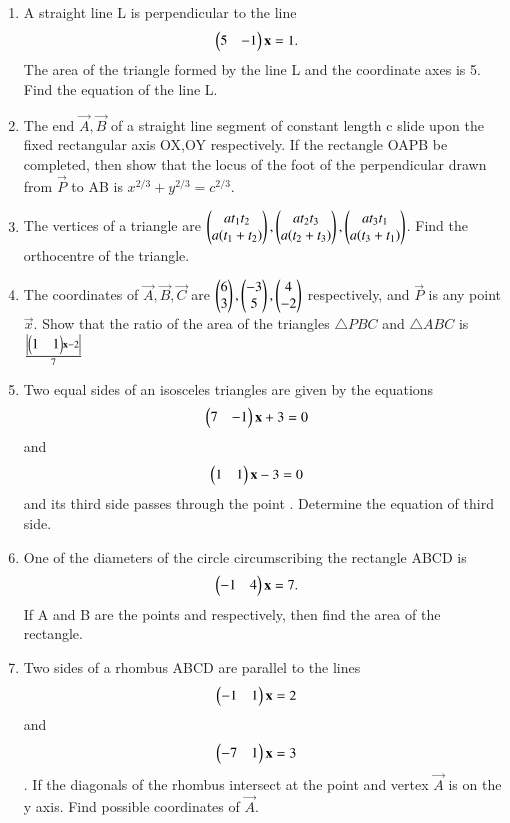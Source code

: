 \begin{enumerate}[label=\arabic*.,ref=\thesubsection.\theenumi]
    \item A straight line L is perpendicular to the line \begin{align}\begin{pmatrix}5 & -1\end{pmatrix} \mathbf {x} &= 1.\end{align} The area of the triangle formed by the line L and the coordinate axes is 5. Find the equation of the line L.
    \item The end $\vec{A},\vec{B}$ of a straight line segment of constant length c slide upon the fixed rectangular axis OX,OY respectively. If the rectangle OAPB be completed, then show that the locus of the foot of the perpendicular drawn from $\vec{P}$ to AB is $x^{2/3}+y^{2/3}=c^{2/3}$.
    \item The vertices of a triangle are $\begin{pmatrix}a t_1t_2 \\ a(t_1+t_2)\end{pmatrix},\begin{pmatrix}a t_2t_3 \\ a(t_2+t_3)\end{pmatrix},\begin{pmatrix}a t_3t_1\\ a(t_3+t_1)\end{pmatrix}$. Find the orthocentre of the triangle.
    \item The coordinates of $\vec{A}, \vec{B}, \vec{C}$ are $\begin{pmatrix}6\\3\end{pmatrix},\begin{pmatrix}-3\\5\end{pmatrix},\begin{pmatrix}4\\-2\end{pmatrix}$ respectively, and $\vec{P}$ is any point $\vec{x}$. Show that the ratio of the area of the triangles $\triangle PBC$ and $\triangle ABC$ is $ \frac{\left\vert\begin{pmatrix}1 & 1\end{pmatrix}\mathbf {x}-2\right\vert}{7}$
    \item Two equal sides of an isosceles triangles are given by the equations \begin{align}\begin{pmatrix}7 & -1\end{pmatrix} \mathbf {x} + 3 &= 0 \end{align} and \begin{align}\begin{pmatrix}1 & 1\end{pmatrix} \mathbf {x} - 3 &= 0 \end{align} and its third side passes through the point . Determine the equation of third side.
    \item One of the diameters of the circle circumscribing the rectangle ABCD is \begin{align}\begin{pmatrix}-1 & 4\end{pmatrix} \mathbf {x}  &= 7. \end{align} If A and B are the points  and  respectively, then find the area of the rectangle.
    \item Two sides of a rhombus ABCD are parallel to the lines \begin{align}\begin{pmatrix}-1 & 1\end{pmatrix} \mathbf {x}  &= 2 \end{align} and \begin{align}\begin{pmatrix}-7 & 1\end{pmatrix} \mathbf {x}  &= 3 \end{align}. If the diagonals of the rhombus intersect at the point  and  vertex $\vec{A}$ is on the y axis. Find possible coordinates of $\vec{A}$.

\end{enumerate}
